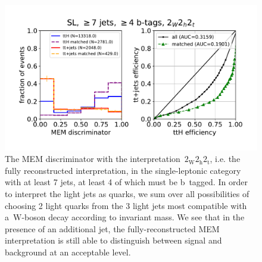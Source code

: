 \begin{figure}
\begin{centering}
\includegraphics[width = 1.0\textwidth]{figures/mem_sl_jge7_tge4.pdf}
\caption[The MEM discriminator with the~$2_{\mathrm{W}} 2_{\mathrm{h}} 2_{\mathrm{t}}$ interpretation in the $\ge7$-jet, $\ge4$-tag category.]{The MEM discriminator with the interpretation~$2_{\mathrm{W}} 2_{\mathrm{h}} 2_{\mathrm{t}}$, i.e. the fully reconstructed interpretation, in the single-leptonic category with at least 7 jets, at least 4 of which must be b~tagged. In order to interpret the light jets as quarks, we sum over all possibilities of choosing 2 light quarks from the 3 light jets most compatible with a~$\mathrm{W}$-boson decay according to invariant mass. We see that in the presence of an additional jet, the fully-reconstructed MEM interpretation is still able to distinguish between signal and background at an acceptable level.}
\label{fig:mem_sl_jge7_tge4}
\end{centering}
\end{figure}

